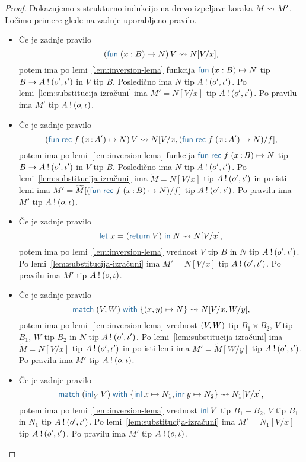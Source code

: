 \begin{proof}
	Dokazujemo z strukturno indukcijo na drevo izpeljave koraka $M \leadsto M'$.
	Ločimo primere glede na zadnje uporabljeno pravilo.
	
	\begin{itemize}
		\item Če je zadnje pravilo $$\tmapp{(\tmfun{x : B}{N})}{V} \reduces N[V/x],$$ potem ima po lemi~\ref{lem:inversion-lema} funkcija $\tmfun{x : B}{N}$ tip $B \to A \mathbin{!} (o', \iota')$ in $V$ tip $B$. Posledično ima $N$ tip $A \mathbin{!} (o', \iota')$. Po lemi~\ref{lem:substitucija-izračuni} ima $M' = N[V/x]$ tip $A \mathbin{!} (o', \iota')$.
		Po pravilu  ima $M'$ tip $A \mathbin{!} (o, \iota)$.
		
		\item Če je zadnje pravilo $$\tmapp{(\tmfunrec{f}{x \of A'}{N})}{V} \reduces N[V/x, (\tmfunrec{f}{x \of A'}{N})/f],$$ potem ima po lemi~\ref{lem:inversion-lema} funkcija $\tmfunrec{f}{x \of B}{N}$ tip $B \to A \mathbin{!} (o', \iota')$ in $V$ tip $B$. Posledično ima $N$ tip $A \mathbin{!} (o', \iota')$. Po lemi~\ref{lem:substitucija-izračuni} ima $\widetilde{M} = N[V/x]$ tip $A \mathbin{!} (o', \iota')$ in po isti lemi ima $M' = \widetilde{M}[(\tmfunrec{f}{x \of B}{N})/f]$ tip $A \mathbin{!} (o', \iota')$.
		Po pravilu  ima $M'$ tip $A \mathbin{!} (o, \iota)$.
		
		\item Če je zadnje pravilo $$\tmlet{x}{(\tmreturn V)}{N} \reduces N[V/x],$$ potem ima po lemi~\ref{lem:inversion-lema} vrednost $V$ tip $B$ in $N$ tip $A \mathbin{!} (o', \iota')$.
		Po lemi~\ref{lem:substitucija-izračuni} ima $M' = N[V/x]$ tip $A \mathbin{!} (o', \iota')$.
		Po pravilu  ima $M'$ tip $A \mathbin{!} (o, \iota)$.
		
		\item Če je zadnje pravilo $$\tmmatch{\tmpair{V}{W}}{\tmpair{x}{y} \mapsto N} \reduces N[V/x, W/y],$$ potem ima po lemi~\ref{lem:inversion-lema} vrednost $( V , W )$ tip $B_1 \times B_2$, $V$ tip $B_1$, $W$ tip $B_2$ in $N$ tip $A \mathbin{!} (o', \iota')$. Po lemi~\ref{lem:substitucija-izračuni} ima $\widetilde{M} = N[V/x]$ tip $A \mathbin{!} (o', \iota')$ in po isti lemi ima $M' = \widetilde{M}[W/y]$ tip $A \mathbin{!} (o', \iota')$.
		Po pravilu  ima $M'$ tip $A \mathbin{!} (o, \iota)$.
		
		\item Če je zadnje pravilo $$\tmmatch{(\tminl[Y]{V})}{\tminl{x} \mapsto N_1, \tminr{y} \mapsto N_2} \reduces N_1[V/x],$$ potem ima po lemi~\ref{lem:inversion-lema} vrednost $\tminl{V}$ tip $B_1 + B_2$, $V$ tip $B_1$ in $N_1$ tip $A \mathbin{!} (o', \iota')$.
		Po lemi~\ref{lem:substitucija-izračuni} ima $M' = N_1[V/x]$ tip $A \mathbin{!} (o', \iota')$.
		Po pravilu  ima $M'$ tip $A \mathbin{!} (o, \iota)$.
		

\end{itemize}
\end{proof}
